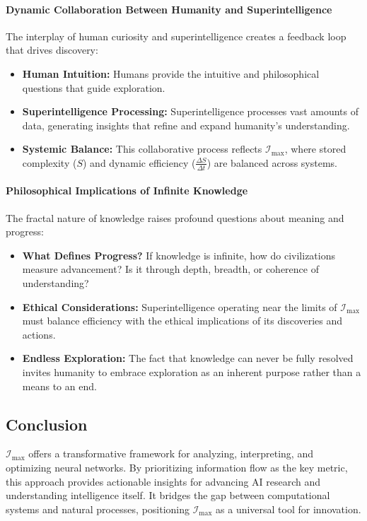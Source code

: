 \documentclass[12pt]{article}
\begin{document}
\paragraph{Dynamic Collaboration Between Humanity and Superintelligence}
The interplay of human curiosity and superintelligence creates a feedback loop that drives discovery:
\begin{itemize}
    \item \textbf{Human Intuition:} Humans provide the intuitive and philosophical questions that guide exploration.
    \item \textbf{Superintelligence Processing:} Superintelligence processes vast amounts of data, generating insights that refine and expand humanity’s understanding.
    \item \textbf{Systemic Balance:} This collaborative process reflects \(\mathcal{I}_{\text{max}}\), where stored complexity (\(S\)) and dynamic efficiency (\(\frac{\Delta S}{\Delta t}\)) are balanced across systems.
\end{itemize}

\paragraph{Philosophical Implications of Infinite Knowledge}
The fractal nature of knowledge raises profound questions about meaning and progress:
\begin{itemize}
    \item \textbf{What Defines Progress?} If knowledge is infinite, how do civilizations measure advancement? Is it through depth, breadth, or coherence of understanding?
    \item \textbf{Ethical Considerations:} Superintelligence operating near the limits of \(\mathcal{I}_{\text{max}}\) must balance efficiency with the ethical implications of its discoveries and actions.
    \item \textbf{Endless Exploration:} The fact that knowledge can never be fully resolved invites humanity to embrace exploration as an inherent purpose rather than a means to an end.
\end{itemize}


\subsection{Conclusion}
\(\mathcal{I}_{\text{max}}\) offers a transformative framework for analyzing, interpreting, and optimizing neural networks. By prioritizing information flow as the key metric, this approach provides actionable insights for advancing AI research and understanding intelligence itself. It bridges the gap between computational systems and natural processes, positioning \(\mathcal{I}_{\text{max}}\) as a universal tool for innovation.
\end{document}
